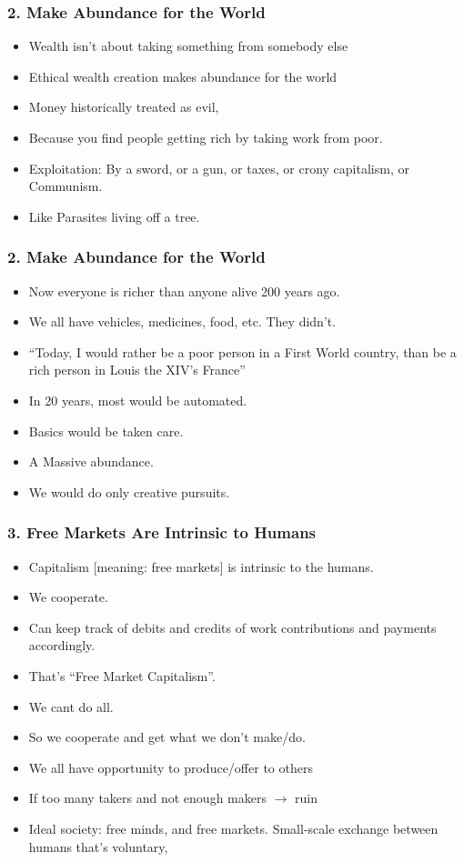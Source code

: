 \begin{frame}[fragile]
\frametitle{2. Make Abundance for the World}
\begin{itemize}
\item Wealth isn't about taking something from somebody else
\item Ethical wealth creation makes abundance for the world
\item Money historically treated as evil, 
\item Because you find people getting rich by taking work from poor. 
\item Exploitation: By a sword, or a gun, or taxes, or crony capitalism, or Communism. \item Like Parasites living off a tree.
\end{itemize}
\end{frame}

\begin{frame}[fragile]
\frametitle{2. Make Abundance for the World}
\begin{itemize}
\item Now everyone is richer than anyone alive 200 years ago.
\item We all have vehicles, medicines, food, etc. They didn't.
\item ``Today, I would rather be a poor person in a First World country, than be a rich person in Louis the XIV's France''
\item In 20 years, most would be automated. 
\item Basics would be taken care. 
\item A Massive abundance.
\item We would do only creative pursuits.
\end{itemize}
\end{frame}


\begin{frame}[fragile]
\frametitle{3. Free Markets Are Intrinsic to Humans}
\begin{itemize}
\item Capitalism [meaning: free markets] is intrinsic to the humans. 
\item We cooperate. 
\item Can keep track of debits and credits of work contributions and payments accordingly. 
\item That's ``Free Market Capitalism''.
\item We cant do all. 
\item So we cooperate and get what we don't make/do. 
\item We all have opportunity to produce/offer to others
\item If too many takers and not enough makers $\rightarrow$ ruin
\item Ideal society: free minds, and free markets. Small-scale exchange between humans that's voluntary,
\end{itemize}
\end{frame}

